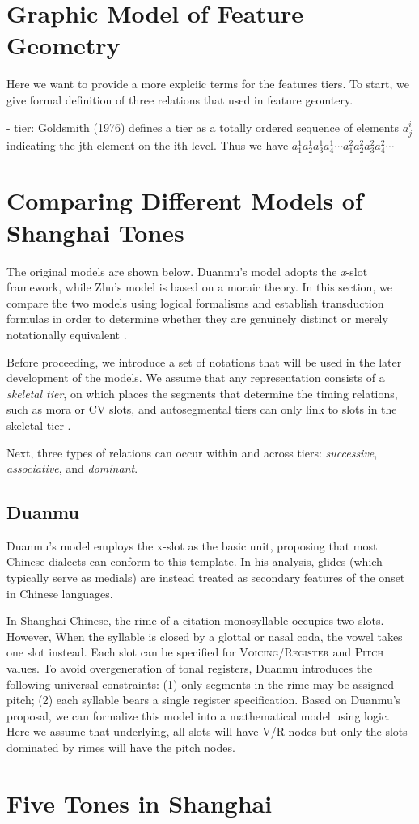 \documentclass[11pt]{article}
\begin{document}
\section{Graphic Model of Feature Geometry}

Here we want to provide a more explciic terms for the features tiers. To start,
we give formal definition of three
relations that used in feature geomtery.

- tier: Goldsmith (1976) defines a tier as a totally ordered  sequence of
elements $a^i_j$ indicating the jth element on the ith level. Thus we have
\(
a^1_1a^1_2a^1_3a^1_4 \cdots
a^2_1a^2_2a^2_3a^2_4 \cdots
\)


\section{Comparing Different Models of Shanghai Tones}
The original models are shown below. Duanmu’s model adopts the \textit{x}-slot
framework,
while Zhu’s model is based on a moraic theory. In this section, we compare the
two
models using logical formalisms and establish transduction formulas in order to 
determine whether they are genuinely distinct or merely notationally equivalent 
\citep{strother2019diss,oakdenNotationalEquivalenceTonal2020}.

Before proceeding, we introduce a set of notations that will be used in the
later
development of the models. We assume that any representation consists of a 
\emph{skeletal tier}, on which places the segments that determine the timing 
relations, such as mora or CV slots, and autosegmental tiers can only link 
to slots in the skeletal tier \citep{pulleyblank1983diss}.

Next, three types of relations can occur within and across tiers:
\textit{successive},
\textit{associative}, and \textit{dominant}.


\subsection{Duanmu}
Duanmu’s model employs the x-slot as the basic unit, proposing that most
Chinese
dialects can conform to this template. In his analysis, glides (which typically 
serve as medials) are instead treated as secondary features of the onset in
Chinese languages.

In Shanghai Chinese, the rime of a citation monosyllable occupies two slots.
However,
When the syllable is closed by a glottal or nasal coda, the vowel takes one
slot instead.
Each slot can be specified for \textsc{Voicing/Register} and \textsc{Pitch}
values.
To avoid overgeneration of tonal registers, Duanmu introduces the following
universal
constraints: (1) only segments in the rime may be assigned pitch; (2) each
syllable
bears a single register specification. Based on Duanmu's proposal, we can
formalize this model into a mathematical model using
logic. Here we assume that underlying, all slots will have V/R nodes but only
the slots
dominated by rimes will have the pitch nodes.





\section{Five Tones in Shanghai}





\end{document}
